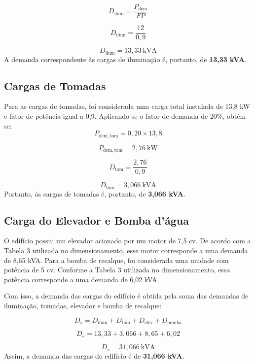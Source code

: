 \documentclass[12pt,openright,oneside,a4paper,brazil]{abntex2}
\begin{document}
\begin{equation}
    D_{\mathrm{ilum}} = \frac{P_{\mathrm{dem}}}{FP}
    \label{eq:potencia_aparente_iluminacao}
\end{equation}

\[
D_{\mathrm{ilum}} = \frac{12}{0,9}
\]

\[
D_{\mathrm{ilum}} = 13,33\ \mathrm{kVA}
\]
A demanda correspondente às cargas de iluminação é, portanto, de \textbf{13,33 kVA}.

\subsection{Cargas de Tomadas}
\hspace{1.27cm}Para as cargas de tomadas, foi considerada uma carga total instalada de 13,8 kW e fator de potência igual a 0,9. Aplicando-se o fator de demanda de 20\%, obtém-se:
\[
P_{\mathrm{dem,tom}} = 0,20 \times 13,8
\]

\[
P_{\mathrm{dem,tom}} = 2,76\ \mathrm{kW}
\]

\[
D_{\mathrm{tom}} = \frac{2,76}{0,9}
\]

\[
D_{\mathrm{tom}} = 3,066\ \mathrm{kVA}
\]
Portanto, às cargas de tomadas é, portanto, de \textbf{3,066 kVA}.

\subsection{Carga do Elevador e Bomba d'água}
\hspace{1.27cm}O edifício possui um elevador acionado por um motor de 7,5 cv. De acordo com a Tabela 3 utilizada no dimensionamento, esse motor corresponde a uma demanda de 8,65 kVA. Para a bomba de recalque, foi considerada uma unidade com potência de 5 cv. Conforme a Tabela 3 utilizada no dimensionamento, essa potência corresponde a uma demanda de 6,02 kVA.

Com isso, a demanda das cargas do edifício é obtida pela soma das demandas de iluminação, tomadas, elevador e bomba de recalque:

\begin{equation}
    D_s = D_{\mathrm{ilum}} + D_{\mathrm{tom}} + D_{\mathrm{elev}} + D_{\mathrm{bomba}}
    \label{eq:demanda_edificio}
\end{equation}

\[
D_s = 13,33 + 3,066 + 8,65 + 6,02
\]

\[
D_s = 31,066\ \mathrm{kVA}
\]
Assim, a demanda das cargas do edifício é de \textbf{31,066 kVA}.
\end{document}
